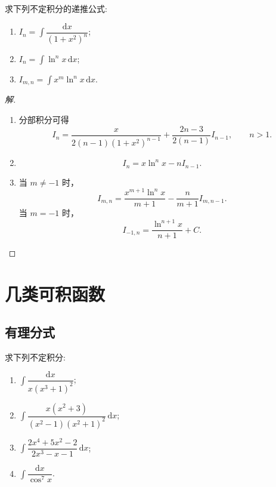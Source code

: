 \documentclass[../../数学分析培优讲义(答案版).tex]{subfiles}
\begin{document}
\begin{example}
求下列不定积分的递推公式:
\begin{enumerate}[label=(\arabic*)]
    \item $\displaystyle I_n=\int\dfrac{\mathrm{d}x}{(1+x^2)^n}$;
    \item $\displaystyle I_n=\int\ln^n x\,\mathrm{d}x$;
    \item $\displaystyle I_{m,n}=\int x^m\ln^n x\,\mathrm{d}x$.
\end{enumerate}
\end{example}

\begin{proof}[解]
\begin{enumerate}[label=(\arabic*)]
    \item 分部积分可得
    \[
        I_n=\dfrac{x}{2(n-1)(1+x^2)^{n-1}}
        +\dfrac{2n-3}{2(n-1)}I_{n-1},
        \qquad n>1.
    \]
    \item
    \[
        I_n=x\ln^n x-nI_{n-1}.
    \]
    \item 当 $m\neq-1$ 时，
    \[
        I_{m,n}=\dfrac{x^{m+1}\ln^n x}{m+1}
        -\dfrac{n}{m+1}I_{m,n-1}.
    \]
    当 $m=-1$ 时，
    \[
        I_{-1,n}=\dfrac{\ln^{n+1}x}{n+1}+C.
    \]
\end{enumerate}
\end{proof}

\newpage

\section{几类可积函数}

\subsection{有理分式}

\begin{example}
求下列不定积分:
\begin{enumerate}[label=(\arabic*)]
    \item $\displaystyle\int\dfrac{\mathrm{d}x}{x(x^3+1)^2}$;
    \item $\displaystyle\int\dfrac{x(x^2+3)}{(x^2-1)(x^2+1)^2}\,\mathrm{d}x$;
    \item $\displaystyle\int\dfrac{2x^4+5x^2-2}{2x^3-x-1}\,\mathrm{d}x$;
    \item $\displaystyle\int\dfrac{\mathrm{d}x}{\cos^7x}$.
\end{enumerate}
\end{example}
\end{document}
